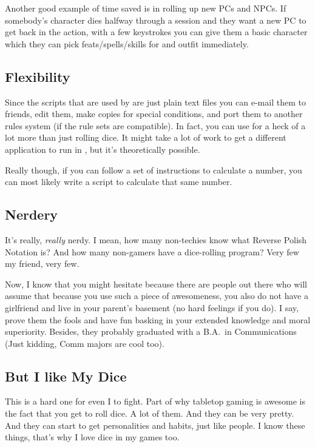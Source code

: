 Another good example of time saved is in rolling up new PCs and NPCs. If
somebody's character dies halfway through a session and they want a new PC to
get back in the action, with a few keystrokes you can give them a basic
character which they can pick feats/spells/skills for and outfit immediately.


\subsection*{Flexibility}
\label{whyflex}
Since the scripts that are used by \progLogo are just plain text files you can
e-mail them to friends, edit them, make copies for special conditions, and port
them to another rules system (if the rule sets are compatible). In fact,
you can use \progLogo for a heck of a lot more than just rolling dice.
It might take a lot of work to get a different application to run in \progLogo,
but it's theoretically possible.

Really though, if you can follow a set of instructions to calculate a number,
you can most likely write a \progLogo script to calculate that same number. 

\subsection*{Nerdery}
\label{whynerd}
It's really, {\it really} nerdy. I mean, how many non-techies know what
Reverse Polish Notation is? And how many non-gamers have a dice-rolling
program? Very few my friend, very few.

Now, I know that you might hesitate because there are people out
there who will assume that because you use such a piece of awesomeness,
you also do not have a girlfriend and live in your parent's basement (no hard
feelings if you do). I say, prove them the fools and have fun basking in your
extended knowledge and moral superiority. Besides, they probably graduated with
a B.A.\ in Communications (Just kidding, Comm majors are cool too).

\subsection*{But I like My Dice}
\label{ilikedice}
This is a hard one for even I to fight. Part of why tabletop gaming is
awesome is the fact that you get to roll dice. A lot of them. And they can be
very pretty. And they can start to get personalities and habits, just like
people. I know these things, that's why I love dice in my games too.

